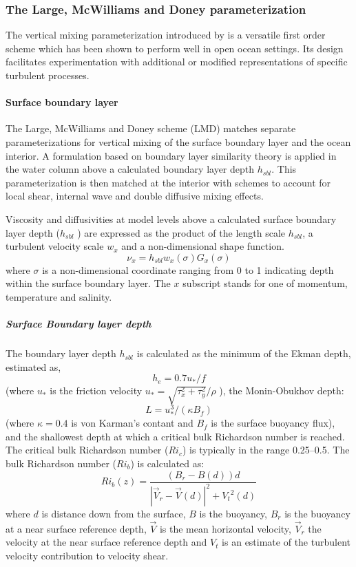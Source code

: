\subsubsection{The Large, McWilliams and Doney parameterization}
\label{sec:origLMD}

The vertical mixing parameterization introduced by
\cite{Large94} is a versatile first order scheme which has
been shown to perform well in open ocean settings.  Its design
facilitates experimentation with additional or modified representations
of specific turbulent processes.

\paragraph{Surface boundary layer}
The Large, McWilliams and Doney scheme (LMD)
matches separate parameterizations for vertical mixing
of the surface boundary layer and the ocean interior.  A formulation
based on boundary layer similarity theory is applied in the water
column above a calculated boundary layer depth $h_{sbl}$.  This
parameterization is then matched at the interior with schemes to
account for local shear, internal wave and double diffusive mixing
effects.  

Viscosity and diffusivities at model levels above a calculated
surface boundary layer depth ($h_{sbl}$ ) are expressed as the product
of the length scale $h_{sbl}$, a turbulent velocity scale $w_x$ and a
non-dimensional shape function.
\begin{equation}
\nu_x = h_{sbl} w_x(\sigma)G_x(\sigma)
\end{equation}
where $\sigma$ is a non-dimensional coordinate ranging from 0 to 1
indicating depth within the surface boundary layer. The $x$ subscript
stands for one of momentum, temperature and salinity.

\subparagraph{Surface Boundary layer depth}
The boundary layer depth $h_{sbl}$ is calculated as the minimum of the
Ekman depth, estimated as,
\begin{equation}
h_e=0.7u_*/f
\end{equation}
(where $u_*$ is the friction velocity $u_*=\sqrt{\tau_x^2+\tau_y^2}/\rho$ ),
 the Monin-Obukhov depth:
\begin{equation}
L=u_*^3/(\kappa B_f)
\end{equation}
(where $\kappa = 0.4$ is von Karman's contant and $B_f$ is the surface
buoyancy flux), and the shallowest depth at which a critical bulk
Richardson number is reached. The critical bulk Richardson number
($Ri_c$) is typically in the range 0.25--0.5. The bulk Richardson
number ($Ri_b$) is calculated as:
\begin{equation}
Ri_b(z)=\frac{(B_r-B(d))d}{|\vec{V}_r-\vec{V}(d)|^2+{V_t}^2(d)}
\end{equation}
where $d$ is distance down from the surface, $B$ is the buoyancy,
$B_r$ is the buoyancy at a near surface reference depth, $\vec{V}$ is
the mean horizontal velocity, $\vec{V}_r$ the velocity at the near
surface reference depth and $V_t$ is an estimate of the turbulent
velocity contribution to velocity shear.

